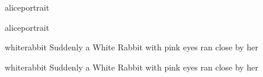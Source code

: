 \documentclass[
paper=5.5in:8.5in,
]{scrbook}
\begin{document}
\frontmatter
\begin{pictures}
\pagestyle{empty}


\clearpage
\end{pictures}

	\pagestyle{plain}
\begin{pictures}
	\begin{letter}
		\begin{colorbigpic}
			[0.9]
			{aliceportrait}
			{}
		\end{colorbigpic}
	\end{letter}
	
	\begin{a4}
		\begin{colorbigpic}
			[0.8]
			{aliceportrait}
			{}
		\end{colorbigpic}	
	\end{a4}	
	\clearpage
\end{pictures}
\tableofcontents


{}

 
\cleardoubleevenpage
\begin{pictures}
	\begin{letter}
		\begin{colorbigpic}
			[1.1]
			{whiterabbit}
			{Suddenly a White Rabbit with pink eyes ran close by her}
		\end{colorbigpic}
	\end{letter}
	
	\begin{a4}
		\begin{colorbigpic}
			[1.0]
			{whiterabbit}
			{Suddenly a White Rabbit with pink eyes ran close by her}
		\end{colorbigpic}	
	\end{a4}
\end{pictures}

\mainmatter
\pagestyle{headings}


















\renewcommand*{\chapterheadendvskip}{\vfill}
\renewcommand*{\chapterheadstartvskip}{\vfill}
\end{document}
